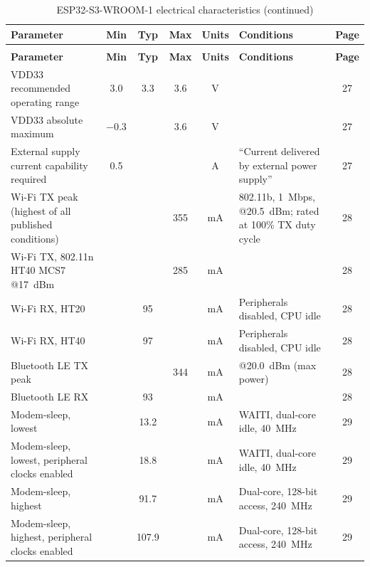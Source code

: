 {\footnotesize
\begin{longtable}{|L{4.3cm}|c|c|c|c|L{3.0cm}|c|}
\caption{ESP32-S3-WROOM-1 electrical characteristics}\label{tab:esp32}\\
\hline
\textbf{Parameter} & \textbf{Min} & \textbf{Typ} & \textbf{Max} & \textbf{Units} & \textbf{Conditions} & \textbf{Page} \\
\hline
\endfirsthead
\caption[]{ESP32-S3-WROOM-1 electrical characteristics (continued)}\\
\hline
\textbf{Parameter} & \textbf{Min} & \textbf{Typ} & \textbf{Max} & \textbf{Units} & \textbf{Conditions} & \textbf{Page} \\
\hline
\endhead
VDD33 recommended operating range & \num{3.0} & \num{3.3} & \num{3.6} & \si{\volt} & & 27 \\
\hline
VDD33 absolute maximum & \num{-0.3} & & \num{3.6} & \si{\volt} & & 27 \\
\hline
External supply current capability required & \num{0.5} & & & \si{\ampere} & ``Current delivered by external power supply'' & 27 \\
\hline
Wi-Fi TX peak (highest of all published conditions) & & & \num{355} & \si{\milli\ampere} & 802.11b, 1~Mbps, @20.5~dBm; rated at 100\% TX duty cycle & 28 \\
\hline
Wi-Fi TX, 802.11n HT40 MCS7 @17~dBm & & & \num{285} & \si{\milli\ampere} & & 28 \\
\hline
Wi-Fi RX, HT20 & & \num{95} & & \si{\milli\ampere} & Peripherals disabled, CPU idle & 28 \\
\hline
Wi-Fi RX, HT40 & & \num{97} & & \si{\milli\ampere} & Peripherals disabled, CPU idle & 28 \\
\hline
Bluetooth LE TX peak & & & \num{344} & \si{\milli\ampere} & @20.0~dBm (max power) & 28 \\
\hline
Bluetooth LE RX & & \num{93} & & \si{\milli\ampere} & & 28 \\
\hline
Modem-sleep, lowest & & \num{13.2} & & \si{\milli\ampere} & WAITI, dual-core idle, 40~MHz & 29 \\
\hline
Modem-sleep, lowest, peripheral clocks enabled & & \num{18.8} & & \si{\milli\ampere} & WAITI, dual-core idle, 40~MHz & 29 \\
\hline
Modem-sleep, highest & & \num{91.7} & & \si{\milli\ampere} & Dual-core, 128-bit access, 240~MHz & 29 \\
\hline
Modem-sleep, highest, peripheral clocks enabled & & \num{107.9} & & \si{\milli\ampere} & Dual-core, 128-bit access, 240~MHz & 29 \\

\end{longtable}}

